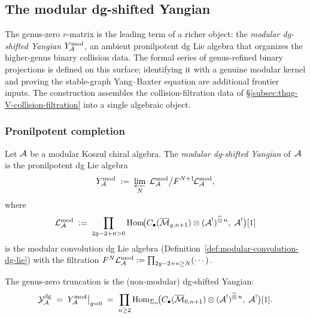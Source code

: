 %
%

\subsection{The modular dg-shifted Yangian}
\label{subsec:thqg-V-modular-yangian}

The genus-zero $r$-matrix is the leading term of a richer object:
the \emph{modular dg-shifted Yangian} $Y^{\mathrm{mod}}_{\mathcal{A}}$, an ambient
pronilpotent dg Lie algebra that organizes the higher-genus binary
collision data. The formal series of genus-refined binary
projections is defined on this surface; identifying it with a genuine
modular kernel and proving the stable-graph Yang--Baxter equation are
additional frontier inputs. The construction assembles the
collision-filtration data of
\S\ref{subsec:thqg-V-collision-filtration} into a single algebraic
object.

\subsubsection{Pronilpotent completion}

\begin{definition}
\label{def:thqg-V-modular-yangian}
Let $\mathcal{A}$ be a modular Koszul chiral algebra.
The \emph{modular dg-shifted Yangian} of~$\mathcal{A}$ is the pronilpotent
dg Lie algebra
\begin{equation}\label{eq:thqg-V-modular-yangian}
Y^{\mathrm{mod}}_{\mathcal{A}}
\;:=\;
\varprojlim_N\;
\mathcal{L}_{\mathcal{A}}^{\mathrm{mod}} \big/ F^{N+1}\!
 \mathcal{L}_{\mathcal{A}}^{\mathrm{mod}},
\end{equation}
where
\begin{equation}\label{eq:thqg-V-convolution}
\mathcal{L}_{\mathcal{A}}^{\mathrm{mod}}
\;:=\;
\prod_{2g-2+n > 0}
\operatorname{Hom}\!\bigl(
 C_\bullet(\overline{\mathcal{M}}_{g,n+1})
 \otimes (\mathcal{A}^!)^{\widehat{\otimes}\,n},\;
 \mathcal{A}^!
\bigr)[1]
\end{equation}
is the modular convolution dg Lie algebra
\textup{(}Definition~\textup{\ref{def:modular-convolution-dg-lie})}
with the filtration
$F^N \mathcal{L}_{\mathcal{A}}^{\mathrm{mod}}
:= \prod_{2g-2+n \geq N}(\cdots)$.

The genus-zero truncation is the
(non-modular) dg-shifted Yangian:
\begin{equation}\label{eq:thqg-V-genus-zero-truncation}
\mathcal{Y}^{\mathrm{dg}}_{\mathcal{A}}
\;=\;
Y^{\mathrm{mod}}_{\mathcal{A}}\big|_{g=0}
\;=\;
\prod_{n \geq 2}
\operatorname{Hom}_{\Sigma_n}\!\bigl(
 C_\bullet(\overline{\mathcal{M}}_{0,n+1})
 \otimes (\mathcal{A}^!)^{\widehat{\otimes}\,n},\;
 \mathcal{A}^!
\bigr)[1].
\end{equation}
\end{definition}

